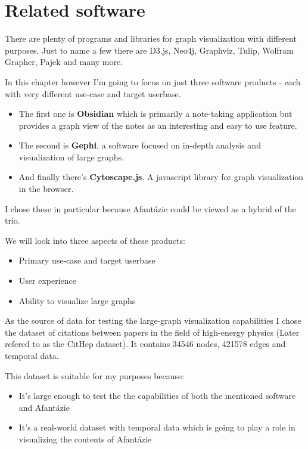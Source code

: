 \chapter{Related software}

There are plenty of programs and libraries for graph visualization with different purposes.
Just to name a few there are D3.js, Neo4j, Graphviz, Tulip, Wolfram Grapher, Pajek and many more.

In this chapter however I'm going to focus on just three software products - each with very different use-case and target userbase.

\begin{itemize}

\item The first one is \textbf{Obsidian} which is primarily a note-taking application
but provides a graph view of the notes as an interesting and easy to use feature. 

\item The second is \textbf{Gephi}, a software focused on in-depth analysis and visualization of large graphs.

\item And finally there's \textbf{Cytoscape.js}. A javascript library for graph visualization in the browser.

\end{itemize}

I chose these in particular because Afantázie could be viewed as a hybrid of the trio.

We will look into three aspects of these products:
\begin{itemize}
  \item Primary use-case and target userbase
  \item User experience
  \item Ability to visualize large graphs
\end{itemize}

As the source of data for testing the large-graph visualization capabilities I chose the dataset of citations between papers
in the field of high-energy physics  (Later refered to as the CitHep dataset).
It contains 34546 nodes, 421578 edges and temporal data.

This dataset is suitable for my purposes because:
\begin{itemize}
  \item It's large enough to test the the capabilities of both the mentioned software and Afantázie
  \item It's a real-world dataset with temporal data which is going to play a role in visualizing the contents of Afantázie
\end{itemize}

